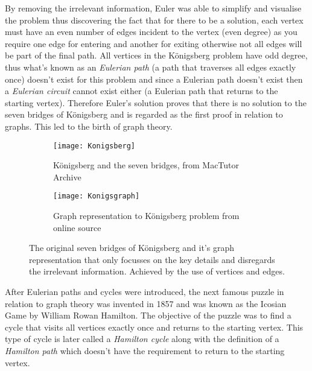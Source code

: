 By removing the irrelevant information, Euler was able to simplify and visualise the problem thus discovering the fact that for there to be a solution, each vertex must have an even number of edges incident to the vertex (even degree) as you require one edge for entering and another for exiting otherwise not all edges will be part of the final path. All vertices in the Königsberg problem have odd degree, thus what's known as an \emph{Eulerian path} (a path that traverses all edges exactly once) doesn't exist for this problem and since a Eulerian path doesn't exist then a \emph{Eulerian circuit} cannot exist either (a Eulerian path that returns to the starting vertex). Therefore Euler's solution proves that there is no solution to the seven bridges of Königsberg and is regarded as the first proof in relation to graphs. This led to the birth of graph theory.

\begin{figure}[!htb]
\centering
\begin{subfigure}{.45\textwidth}
	\texttt{[image: Konigsberg]}
	\caption{Königsberg and the seven bridges, from MacTutor Archive \cite{MacTutor}}
	\label{fig:Königsberg's Bridges}
\end{subfigure}
\hfill
\begin{subfigure}{.45\textwidth}
	\texttt{[image: Konigsgraph]}
	\caption{Graph representation to Königsberg problem from online source \cite{Katie}}
	\label{fig:Königsberg's Graph}
\end{subfigure}
\caption{The original seven bridges of Königsberg and it's graph representation that only focusses on the key details and disregards the irrelevant information. Achieved by the use of vertices and edges.}
\end{figure}

After Eulerian paths and cycles were introduced, the next famous puzzle in relation to graph theory was invented in 1857 and was known as the Icosian Game\cite{carlson_2022} by William Rowan Hamilton. The objective of the puzzle was to find a cycle that visits all vertices exactly once and returns to the starting vertex. This type of cycle is later called a \emph{Hamilton cycle} along with the definition of a \emph{Hamilton path} which doesn't have the requirement to return to the starting vertex.

